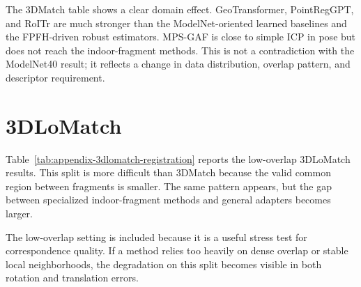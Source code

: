 The 3DMatch table shows a clear domain effect. GeoTransformer, PointRegGPT, and RoITr are much stronger than the ModelNet-oriented learned baselines and the FPFH-driven robust estimators. MPS-GAF is close to simple ICP in pose but does not reach the indoor-fragment methods. This is not a contradiction with the ModelNet40 result; it reflects a change in data distribution, overlap pattern, and descriptor requirement.

\section{3DLoMatch}

Table~\ref{tab:appendix-3dlomatch-registration} reports the low-overlap 3DLoMatch results. This split is more difficult than 3DMatch because the valid common region between fragments is smaller. The same pattern appears, but the gap between specialized indoor-fragment methods and general adapters becomes larger.

The low-overlap setting is included because it is a useful stress test for correspondence quality. If a method relies too heavily on dense overlap or stable local neighborhoods, the degradation on this split becomes visible in both rotation and translation errors.

